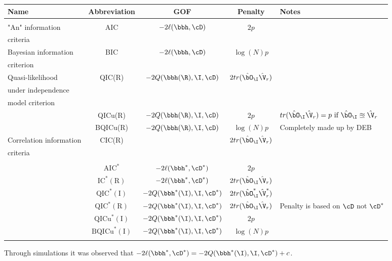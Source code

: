 \documentclass{article}
\begin{document}
\begin{table}[H]
  \centering
  \begin{tabular}{lcccl}
    \hline
    \hline
    Name & Abbreviation & GOF & Penalty & Notes \\
    \hline
    & & & & \\
    "An" information & AIC & $-2\ell(\bbh, \cD)$ & $2p$ & \\
    criteria & & & \\
    Bayesian information & BIC & $-2\ell(\bbh, \cD)$ & $\log(N)p$ & \\
    criterion & & & & \\
    Quasi-likelihood & QIC(R) & $-2Q(\bbh(\R), \I, \cD)$ & $2tr(\hat{\bO}_{\I}\hat{\V}_{r})$ & \\
    under independence & & & & \\
    model criterion & & & & \\
    & QICu(R) & $-2Q(\bbh(\R), \I, \cD)$ & $2p$ & $tr(\hat{\bO}_{\I}\hat{\V}_{r}) = p \text{ if } \hat{\bO}_{\I} \approxeq \hat{\V}_{r} $ \\
    & BQICu(R) & $-2Q(\bbh(\R), \I, \cD)$ & $\log(N)p$ & Completely made up by DEB \\
    Correlation information & CIC(R) & & $2tr(\hat{\bO}_{\I}\hat{\V}_{r})$ & \\
    criteria & & & & \\
    \hline
    & & & & \\
    & $\text{AIC}^{*}$ & $-2\ell(\bbh^{*}, \cD^{*})$ & $2p$ & \\
    & $\text{IC}^{*}(\text{R})$ & $-2\ell(\bbh^{*}, \cD^{*})$ & $2tr(\hat{\bO}_{\I}\hat{\V}_{r})$ & \\
    & $\text{QIC}^{*}(\text{I})$ & $-2Q(\bbh^{*}(\I), \I, \cD^{*})$ & $2tr(\hat{\bO}_{\I}^{*}\hat{\V}_{r}^{*})$ & \\
    & $\text{QIC}^{*}(\text{R})$ & $-2Q(\bbh^{*}(\I), \I, \cD^{*})$ & $2tr(\hat{\bO}_{\I}\hat{\V}_{r})$ & Penalty is based on $\cD$ not $\cD^{*}$\\
    & $\text{QICu}^{*}(\text{I})$ & $-2Q(\bbh^{*}(\I), \I, \cD^{*})$ & $2p$ & \\
    & $\text{BQICu}^{*}(\text{I})$ & $-2Q(\bbh^{*}(\I), \I, \cD^{*})$ & $\log(N)p$ & \\
    & & & & \\
    \hline
    \hline
  \end{tabular}
\end{table}
\noindent Through simulations it was observed that $-2\ell(\bbh^{*}, \cD^{*}) = -2Q(\bbh^{*}(\I), \I, \cD^{*}) + c$. 
\end{document}
